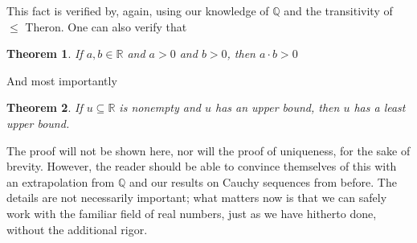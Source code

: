 \documentclass{article}
\newtheorem{thm}{Theorem}[section]
\numberwithin{equation}{section}
\begin{document}
        This fact is verified by, again, using our knowledge of $\mathbb{Q}$ and the transitivity of $\leq$ Theron.
        One can also verify that 
        \begin{thm}
            If $a,b \in \mathbb{R}$ and $a>0$ and $b>0$, then $a \cdot b > 0$
        \end{thm}
        And most importantly 
        \begin{thm}
            If $u \subseteq \mathbb{R}$ is nonempty and $u$ has an upper bound, then $u$ has a least upper bound.
        \end{thm}
        The proof will not be shown here, nor will the proof of uniqueness, for the sake of brevity.
        However, the reader should be able to convince themselves of this with an extrapolation from $\mathbb{Q}$ and
        our results on Cauchy sequences from before. The details are not necessarily important; what matters now is that
        we can safely work with the familiar field of real numbers, just as we have hitherto done, without the additional rigor.
\end{document}
